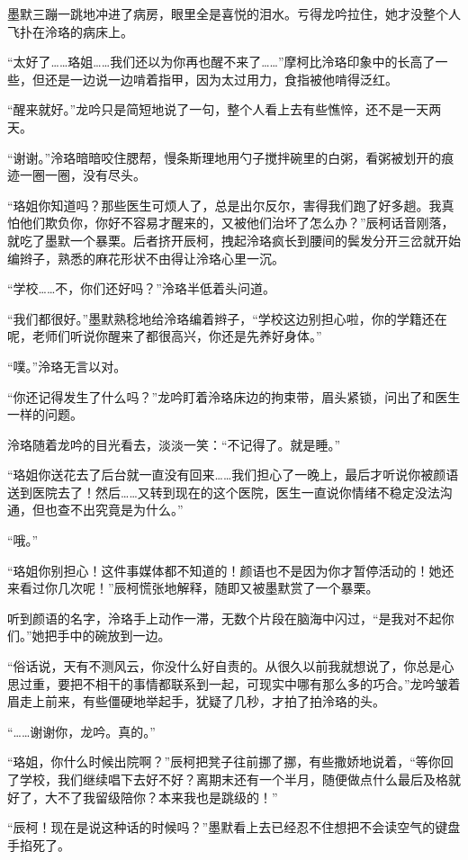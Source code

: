 \documentclass[UTF8, scheme = chinese, openany]{ctexbook}
\begin{document}
墨默三蹦一跳地冲进了病房，眼里全是喜悦的泪水。亏得龙吟拉住，她才没整个人飞扑在泠珞的病床上。

“太好了……珞姐……我们还以为你再也醒不来了……”摩柯比泠珞印象中的长高了一些，但还是一边说一边啃着指甲，因为太过用力，食指被他啃得泛红。

“醒来就好。”龙吟只是简短地说了一句，整个人看上去有些憔悴，还不是一天两天。

“谢谢。”泠珞暗暗咬住腮帮，慢条斯理地用勺子搅拌碗里的白粥，看粥被划开的痕迹一圈一圈，没有尽头。

“珞姐你知道吗？那些医生可烦人了，总是出尔反尔，害得我们跑了好多趟。我真怕他们欺负你，你好不容易才醒来的，又被他们治坏了怎么办？”辰柯话音刚落，就吃了墨默一个暴栗。后者挤开辰柯，拽起泠珞疯长到腰间的鬓发分开三岔就开始编辫子，熟悉的麻花形状不由得让泠珞心里一沉。

“学校……不，你们还好吗？”泠珞半低着头问道。

“我们都很好。”墨默熟稔地给泠珞编着辫子，“学校这边别担心啦，你的学籍还在呢，老师们听说你醒来了都很高兴，你还是先养好身体。”

“噗。”泠珞无言以对。

“你还记得发生了什么吗？”龙吟盯着泠珞床边的拘束带，眉头紧锁，问出了和医生一样的问题。

泠珞随着龙吟的目光看去，淡淡一笑：“不记得了。就是睡。”

“珞姐你送花去了后台就一直没有回来……我们担心了一晚上，最后才听说你被颜语送到医院去了！然后……又转到现在的这个医院，医生一直说你情绪不稳定没法沟通，但也查不出究竟是为什么。”

“哦。”

“珞姐你别担心！这件事媒体都不知道的！颜语也不是因为你才暂停活动的！她还来看过你几次呢！”辰柯慌张地解释，随即又被墨默赏了一个暴栗。

听到颜语的名字，泠珞手上动作一滞，无数个片段在脑海中闪过，“是我对不起你们。”她把手中的碗放到一边。

“俗话说，天有不测风云，你没什么好自责的。从很久以前我就想说了，你总是心思过重，要把不相干的事情都联系到一起，可现实中哪有那么多的巧合。”龙吟皱着眉走上前来，有些僵硬地举起手，犹疑了几秒，才拍了拍泠珞的头。

“……谢谢你，龙吟。真的。”

“珞姐，你什么时候出院啊？”辰柯把凳子往前挪了挪，有些撒娇地说着，“等你回了学校，我们继续唱下去好不好？离期末还有一个半月，随便做点什么最后及格就好了，大不了我留级陪你？本来我也是跳级的！”

“辰柯！现在是说这种话的时候吗？”墨默看上去已经忍不住想把不会读空气的键盘手掐死了。
\end{document}
